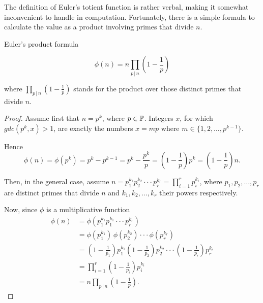 \documentclass{article}
\begin{document}
The definition of Euler's totient function is rather verbal, making it somewhat inconvenient to handle in computation. Fortunately, there is a simple formula to calculate the value as a product involving primes that divide $n$.

\begin{theorem}
Euler's product formula
\label{thm:product}


\begin{equation*}
    \phi(n) = n \prod_{p \,\vert\, n} \left(1 - \frac{1}{p}\right)
\end{equation*}

where $\prod_{p \,\vert\, n} \left(1 - \frac{1}{p}\right)$ stands for the product over those distinct primes that divide $n$.

\begin{proof}

Assume first that $n = p^k$, where $p\in \mathbb{P}$. Integers $x$, for which $gdc(p^k,x)>1$, are exactly the numbers $x=mp$ where $m\in \{1,2,\dots,p^{k-1}\}$.

Hence
\begin{equation*}
    \phi(n)=\phi(p^k)=p^k-p^{k-1}=p^k-\frac{p^k}{p}=\left(1-\frac{1}{p}\right)p^k=\left(1-\frac{1}{p}\right)n.
\end{equation*}

Then, in the general case, assume $n=p_1^{k_1} p_2^{k_2} \cdot \cdot \cdot p_r^{k_r}=\prod_{i=1}^r p_i^{k_i}$, where $p_1,p_2,\dots,p_r$ are distinct primes that divide $n$ and $k_1,k_2,\dots,k_r$ their powers respectively. 


Now, since $\phi$ is a multiplicative function
\begin{align*}
    \phi(n) & = \phi(p_1^{k_1} p_1^{k_1} \cdot \cdot \cdot p_r^{k_r})\\
    & = \phi(p_1^{k_1})\,\phi(p_2^{k_2}) \cdot \cdot \cdot \phi(p_r^{k_r})\\
    & = \left(1-\frac{1}{p_1}\right)p_1^{k_1} \left(1-\frac{1}{p_2}\right)p_2^{k_2} \cdot \cdot \cdot \left(1-\frac{1}{p_r}\right)p_r^{k_r}\\
    & = \prod_{i=1}^r \left(1-\frac{1}{p_i}\right) p_i^{k_i}\\
    & = n \prod_{p \,\vert\, n} \left(1 - \frac{1}{p}\right).
\end{align*}

\end{proof}

\end{theorem}
\end{document}
